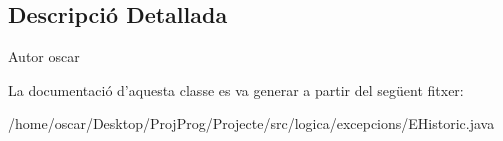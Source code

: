 \subsection{Descripció Detallada}
\begin{DoxyAuthor}{Autor}
oscar 
\end{DoxyAuthor}


La documentació d'aquesta classe es va generar a partir del següent fitxer\+:\begin{DoxyCompactItemize}
\item 
/home/oscar/\+Desktop/\+Proj\+Prog/\+Projecte/src/logica/excepcions/E\+Historic.\+java\end{DoxyCompactItemize}
